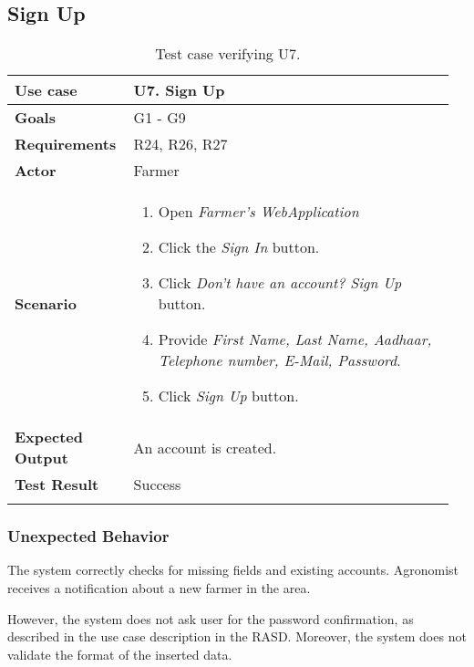 \subsection{Sign Up}
\begin{longtable}{@{}p{0.25\linewidth}p{0.71\linewidth}@{}}
	\toprule
	\textbf{Use case} & \textbf{U7.} Sign Up\\
	\midrule
	\textbf{Goals} & G1 - G9\\
	\midrule
	\textbf{Requirements} & R24, R26, R27\\
	\midrule
	\textbf{Actor} & Farmer\\
	\midrule
	\textbf{Scenario} &
	\begin{enumerate}[leftmargin=.4cm,noitemsep,topsep=0pt,before=\vspace{-3mm},after=\vspace{-4mm}]
		\item Open \textit{Farmer's WebApplication}
		\item Click the \textit{Sign In} button.
		\item Click \textit{Don't have an account? Sign Up} button.
		\item Provide \textit{First Name, Last Name, Aadhaar, Telephone number, E-Mail, Password}.
		\item Click \textit{Sign Up} button.
 	\end{enumerate}\\
	\midrule
	\textbf{Expected Output} & An account is created.\\
	\midrule
	\textbf{Test Result} & Success\\
	\bottomrule
    \caption{Test case verifying U7.}
\end{longtable}

\subsubsection*{Unexpected Behavior}
The system correctly checks for missing fields and existing accounts. Agronomist receives a notification about a new farmer in the area.

However, the system does not ask user for the password confirmation, as described in the use case description in the RASD. Moreover, the system does not validate the format of the inserted data. 


